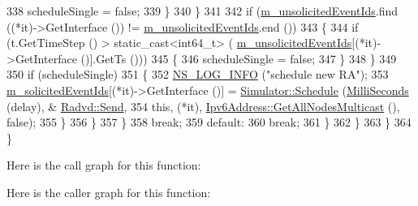 \begin{DoxyCode}
338                               scheduleSingle = \textcolor{keyword}{false};
339                             \}
340                         \}
341 
342                       \textcolor{keywordflow}{if} (\hyperlink{classns3_1_1Radvd_aa214a58cd8ed1b693a177e9611b88177}{m\_unsolicitedEventIds}.find ((*it)->GetInterface ()) != 
      \hyperlink{classns3_1_1Radvd_aa214a58cd8ed1b693a177e9611b88177}{m\_unsolicitedEventIds}.end ())
343                         \{
344                           \textcolor{keywordflow}{if} (t.GetTimeStep () > \textcolor{keyword}{static\_cast<}int64\_t\textcolor{keyword}{>} (
      \hyperlink{classns3_1_1Radvd_aa214a58cd8ed1b693a177e9611b88177}{m\_unsolicitedEventIds}[(*it)->GetInterface ()].GetTs ()))
345                             \{
346                               scheduleSingle = \textcolor{keyword}{false};
347                             \}
348                         \}
349 
350                       \textcolor{keywordflow}{if} (scheduleSingle)
351                         \{
352                           \hyperlink{group__logging_gafbd73ee2cf9f26b319f49086d8e860fb}{NS\_LOG\_INFO} (\textcolor{stringliteral}{"schedule new RA"});
353                           \hyperlink{classns3_1_1Radvd_a135124427566b60ccc12b6b93e708484}{m\_solicitedEventIds}[(*it)->GetInterface ()] = 
      \hyperlink{classns3_1_1Simulator_a671882c894a08af4a5e91181bf1eec13}{Simulator::Schedule} (\hyperlink{group__timecivil_gaf26127cf4571146b83a92ee18679c7a9}{MilliSeconds} (delay), &
      \hyperlink{classns3_1_1Radvd_a2dc4914b58690eaef190f38726d69bb2}{Radvd::Send},
354                                                                                              \textcolor{keyword}{this}, (*it), 
      \hyperlink{classns3_1_1Ipv6Address_a11e6e4228d3d6e814b2c5ffc18c8ed20}{Ipv6Address::GetAllNodesMulticast} (), \textcolor{keyword}{false});
355                         \}
356                     \}
357                 \}
358               \textcolor{keywordflow}{break};
359             \textcolor{keywordflow}{default}:
360               \textcolor{keywordflow}{break};
361             \}
362         \}
363     \}
364 \}
\end{DoxyCode}


Here is the call graph for this function\+:




Here is the caller graph for this function\+:


